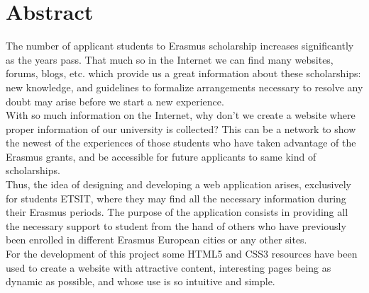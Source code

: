 \chapter{Abstract}
The number of applicant students to Erasmus scholarship increases significantly as the years pass. That much so in the Internet we can find many websites, forums, blogs, etc. which provide us a great information about these scholarships: new knowledge, and guidelines to formalize arrangements necessary to resolve any doubt may arise before we start a new experience.\\

With so much information on the Internet, why don't we create a website where proper information of our university is collected? This can be a network to show the newest of the experiences of those students who have taken advantage of the Erasmus grants, and be accessible for future applicants to same kind of scholarships.\\

Thus, the idea of designing and developing a web application arises, exclusively for students ETSIT, where they may find all the necessary information during their Erasmus periods. The purpose of the application consists in providing all the necessary support to student from the hand of others who have previously been enrolled in different Erasmus European cities or any other sites.\\

For the development of this project some HTML5 and CSS3 resources have been used to create a website with attractive content, interesting pages being as dynamic as possible, and whose use is so intuitive and simple.\\
